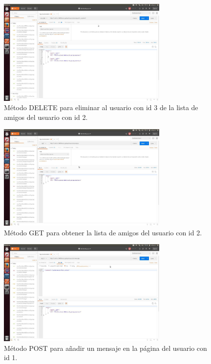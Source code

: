 \documentclass[12pt,a4paper, spanish]{article}
\begin{document}
\begin{figure}[H]
	\centering
	\includegraphics[width=0.75\textwidth]{images/captura18.jpg}
	\caption{Método DELETE para eliminar al usuario con id 3 de la lista de amigos del usuario con id 2.}
\end{figure}


\begin{figure}[H]
	\centering
	\includegraphics[width=0.75\textwidth]{images/captura20.jpg}
	\caption{Método GET para obtener la lista de amigos del usuario con id 2.}
\end{figure}

\begin{figure}[H]
	\centering
	\includegraphics[width=0.75\textwidth]{images/captura21.jpg}
	\caption{Método POST para añadir un mensaje en la página del usuario con id 1.}
\end{figure}
\end{document}
